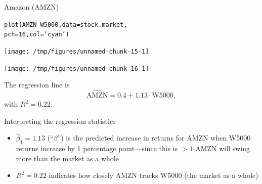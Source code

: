 \documentclass{beamer}\usepackage[]{graphicx}\usepackage[]{color}
\makeatletter
\newcommand{\hlnum}[1]{\textcolor[rgb]{0.824,0.412,0.118}{#1}}%
\newcommand{\hlstr}[1]{\textcolor[rgb]{1,0.894,0.71}{#1}}%
\newcommand{\hlopt}[1]{\textcolor[rgb]{1,0.894,0.769}{#1}}%
\newcommand{\hlstd}[1]{\textcolor[rgb]{1,0.894,0.769}{#1}}%
\newcommand{\hlkwc}[1]{\textcolor[rgb]{0.78,0.941,0.545}{#1}}%
\newcommand{\hlkwd}[1]{\textcolor[rgb]{1,0.78,0.769}{#1}}%
\newenvironment{kframe}{%
 \def\at@end@of@kframe{}%
 \ifinner\ifhmode%
  \def\at@end@of@kframe{\end{minipage}}%
  \begin{minipage}{\columnwidth}%
 \fi\fi%
 \def\FrameCommand##1{\hskip\@totalleftmargin \hskip-\fboxsep
 \colorbox{shadecolor}{##1}\hskip-\fboxsep
     \hskip-\linewidth \hskip-\@totalleftmargin \hskip\columnwidth}%
 \MakeFramed {\advance\hsize-\width
   \@totalleftmargin\z@ \linewidth\hsize
   \@setminipage}}%
 {\par\unskip\endMakeFramed%
 \at@end@of@kframe}
\newenvironment{knitrout}{}{} %
\makeatother
\begin{document}
\begin{darkframes}

    \begin{frame}[fragile]{Amazon (AMZN)}
\begin{knitrout}
\color{fgcolor}\begin{kframe}
\begin{alltt}
\hlkwd{plot}\hlstd{(AMZN} \hlopt{~} \hlstd{W5000,} \hlkwc{data}\hlstd{=stock.market,}
  \hlkwc{pch}\hlstd{=}\hlnum{16}\hlstd{,} \hlkwc{col}\hlstd{=}\hlstr{'cyan'}\hlstd{)}
\end{alltt}
\end{kframe}
\texttt{[image: /tmp/figures/unnamed-chunk-15-1]} 

\end{knitrout}
    \end{frame}

    \begin{frame}[fragile]
\begin{knitrout}
\color{fgcolor}
\texttt{[image: /tmp/figures/unnamed-chunk-16-1]} 

\end{knitrout}

      The regression line is
      \[
        \widehat{\text{AMZN}} = 0.4 + 1.13 \cdot\text{W5000},
      \]
      with $R^2=0.22$.
    \end{frame}

    \begin{frame}{Interpreting the regression statistics}
      \begin{itemize}[<+->]
        \item $\hat\beta_1=1.13$ (``$\beta$'') is the predicted increase in returns for AMZN when W5000 returns increase by 1 percentage point---since this is $>1$ AMZN will swing more than the market as a whole
        \item $R^2=0.22$ indicates how closely AMZN tracks W5000 (the market as a whole)
      \end{itemize}
    \end{frame}


\end{darkframes}
\end{document}

